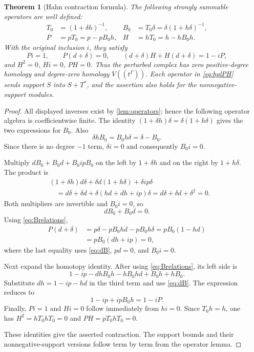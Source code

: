 \documentclass[11pt,letterpaper]{article}
\newtheorem{theorem}{Theorem}[section]
\theoremstyle{definition}
\theoremstyle{remark}
\begin{document}
\begin{theorem}[Hahn contraction formula]\label{thm:hpl}
The following strongly summable operators are well defined:
\begin{align}
 T_0&=(1+\delta h)^{-1},&
 B_0&=T_0\delta=\delta(1+h\delta)^{-1},\label{eq:hplB}\\
 P&=pT_0=p-pB_0h,&
 H&=hT_0=h-hB_0h.\label{eq:hplPH}
\end{align}
With the original inclusion $i$, they satisfy
\begin{equation}\label{eq:hplidentity}
 Pi=1,\qquad P(d+\delta)=0,\qquad
 (d+\delta)H+H(d+\delta)=1-iP,
\end{equation}
and $H^2=0$, $Hi=0$, $PH=0$. Thus the perturbed complex has zero positive-degree homology and degree-zero homology $V((t^\Gamma))$. Each operator in \eqref{eq:hplPH} sends support $S$ into $S+T^*$, and the assertion also holds for the nonnegative-support modules.
\end{theorem}
\begin{proof}
All displayed inverses exist by \cref{lem:operators}; hence the following operator algebra is coefficientwise finite. The identity $(1+\delta h)\delta=\delta(1+h\delta)$ gives the two expressions for $B_0$. Also
\begin{equation}\label{eq:Brelations}
 \delta h B_0=B_0h\delta=\delta-B_0.
\end{equation}
Since there is no degree $-1$ term, $\delta i=0$ and consequently $B_0i=0$.

Multiply $dB_0+B_0d+B_0ipB_0$ on the left by $1+\delta h$ and on the right by $1+h\delta$. The product is
\begin{align*}
 &(1+\delta h)d\delta+\delta d(1+h\delta)+\delta ip\delta\\
 &\hspace{1em}=d\delta+\delta d+\delta(hd+dh+ip)\delta
 =d\delta+\delta d+\delta^2=0.
\end{align*}
Both multipliers are invertible and $B_0i=0$, so
\begin{equation}\label{eq:dB}
 dB_0+B_0d=0.
\end{equation}
Using \eqref{eq:Brelations},
\begin{align*}
 P(d+\delta)
 &=p\delta-pB_0hd-pB_0h\delta
 =pB_0(1-hd)\\
 &=pB_0(dh+ip)=0,
\end{align*}
where the last equality uses \eqref{eq:dB}, $pd=0$, and $B_0i=0$.

Next expand the homotopy identity. After using \eqref{eq:Brelations}, its left side is
\[
 1-ip-dhB_0h-hB_0hd+B_0h+hB_0.
\]
Substitute $dh=1-ip-hd$ in the third term and use \eqref{eq:dB}. The expression reduces to
\[
 1-ip+ipB_0h=1-iP.
\]
Finally, $Pi=1$ and $Hi=0$ follow immediately from $hi=0$. Since $T_0h=h$, one has $H^2=hT_0hT_0=0$ and $PH=pT_0hT_0=0$.

These identities give the asserted contraction. The support bounds and their nonnegative-support versions follow term by term from the operator lemma.
\end{proof}
\end{document}
